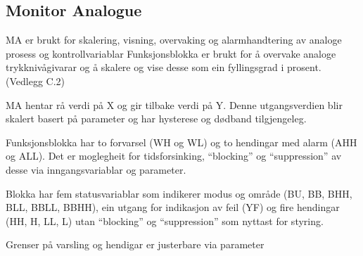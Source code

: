 \newpage

\subsection{Monitor Analogue}
\gls{MA} er brukt for skalering, visning, overvaking og alarmhandtering av
analoge prosess og kontrollvariablar \citep{IEC-63131}
Funksjonsblokka er brukt for å overvake analoge trykknivågivarar 
og å skalere og vise desse som ein fyllingsgrad i prosent. (Vedlegg C.2)

MA hentar rå verdi på X og gir tilbake verdi på Y.
Denne utgangsverdien blir skalert basert på parameter og har hysterese og dødband tilgjengeleg.

Funksjonsblokka har to forvarsel (WH og WL) og to hendingar med alarm (AHH og ALL).
Det er moglegheit for tidsforsinking, ``blocking'' og ``suppression'' av desse via inngangsvariablar og parameter.

Blokka har fem statusvariablar som indikerer modus og område (BU, BB, BHH, BLL, BBLL, BBHH), ein utgang for indikasjon av feil (YF)
og fire hendingar (HH, H, LL, L) utan ``blocking'' og ``suppression'' som nyttast for styring.

Grenser på varsling og hendigar er justerbare via parameter

